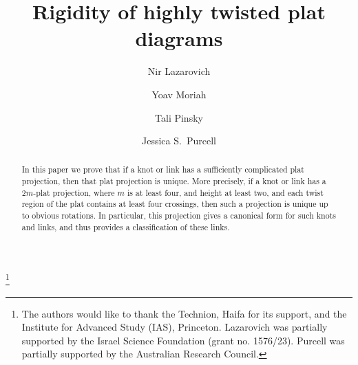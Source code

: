 \documentclass[12pt,reqno]{amsart}
\title{Rigidity of highly twisted plat diagrams}
\theoremstyle{plain}
\theoremstyle{definition}
\begin{document}
\author{Nir Lazarovich}

\author{Yoav Moriah}

\author{Tali Pinsky}

\author{Jessica S.\ Purcell}

\thanks{The authors would like to thank the Technion, Haifa for its
  support, and the Institute for Advanced Study (IAS), Princeton. 
  Lazarovich was partially supported by the Israel Science 
  Foundation (grant no. 1576/23). Purcell
  was partially supported by the Australian Research Council.}




 \address{Department of Mathematics\\
 Technion\\
 Haifa, 32000 Israel}

 \address{Department of Mathematics\\
 Technion\\
 Haifa, 32000 Israel}

 \address{Department of Mathematics\\
 Technion\\
 Haifa, 32000 Israel}

 \address{School of Mathematics\\
   Monash University, VIC 3800 Australia}

\begin{abstract}
  In this paper we prove that if a knot or link has a
  sufficiently complicated plat projection, then that plat projection
  is unique. More precisely, if a knot or link has a $2m$-plat projection,
  where $m$ is at least four, and height at least two, and each twist 
  region of the plat contains at 
  least  four crossings, then such a projection is unique up to obvious 
  rotations. In particular, this projection gives a canonical form for 
  such knots and links, and thus provides a classification of
  these links.
\end{abstract}

\maketitle
\end{document}
